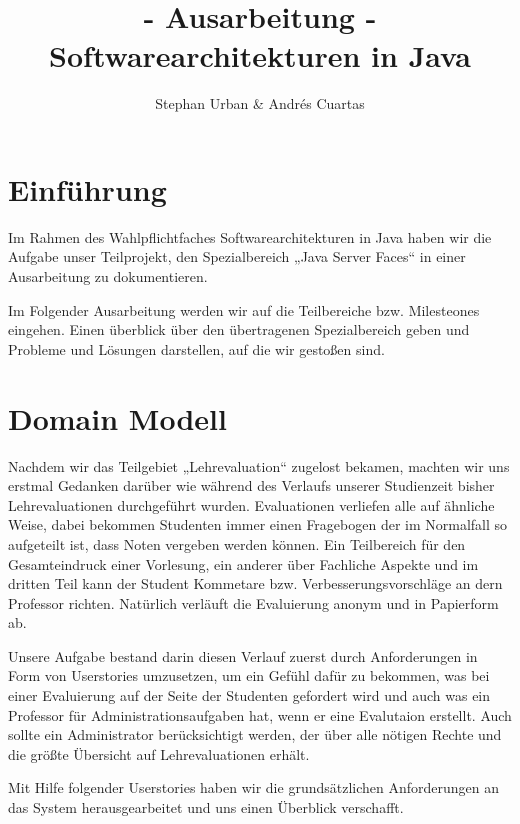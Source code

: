 \documentclass[titlepage, 12pt,a4paper]{scrartcl}
\author{Stephan Urban \& Andrés Cuartas}
\title{- Ausarbeitung - \\ Softwarearchitekturen in Java \\}
\begin{document}
 

\maketitle

\newpage
\tableofcontents
\newpage

\section{Einführung}
Im Rahmen des Wahlpflichtfaches Softwarearchitekturen in Java haben wir die
Aufgabe unser Teilprojekt, den Spezialbereich „Java Server Faces“ in einer
Ausarbeitung zu dokumentieren. 

Im Folgender Ausarbeitung werden wir auf die Teilbereiche bzw. Milesteones
eingehen. Einen überblick über den übertragenen Spezialbereich geben und
Probleme und Lösungen darstellen, auf die wir gestoßen sind. 

\section{Domain Modell}
Nachdem wir das Teilgebiet „Lehrevaluation“ zugelost bekamen, machten wir uns
erstmal Gedanken darüber wie während des Verlaufs unserer Studienzeit bisher
Lehrevaluationen durchgeführt wurden. Evaluationen verliefen alle auf ähnliche
Weise, dabei bekommen Studenten immer einen Fragebogen der im Normalfall so
aufgeteilt ist, dass Noten vergeben werden können. Ein Teilbereich für den
Gesamteindruck einer Vorlesung, ein anderer über Fachliche Aspekte und im
dritten Teil kann der Student Kommetare bzw. Verbesserungsvorschläge an dern
Professor richten. Natürlich verläuft die Evaluierung anonym und in Papierform
ab.

Unsere Aufgabe bestand darin diesen Verlauf zuerst durch Anforderungen in Form
von Userstories umzusetzen, um ein Gefühl dafür zu bekommen, was bei einer
Evaluierung auf der Seite der Studenten gefordert wird und auch was ein
Professor für Administrationsaufgaben hat, wenn er eine  Evalutaion erstellt.
Auch sollte ein Administrator berücksichtigt werden, der über alle nötigen
Rechte und die größte Übersicht auf Lehrevaluationen erhält. 

Mit Hilfe folgender Userstories haben wir die grundsätzlichen Anforderungen an
das System herausgearbeitet und uns einen Überblick verschafft.  
\end{document}
